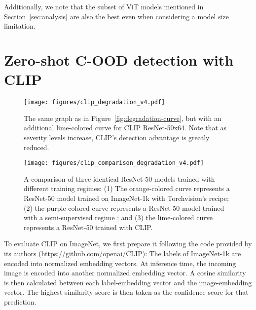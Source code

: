 \documentclass[table]{article} \usepackage{PRIMEarxiv}
\begin{document}
Additionally, we note that the subset of ViT models mentioned in Section~\ref{sec:analysis} are also the best even when considering a model size limitation.

\section{Zero-shot C-OOD detection with CLIP}
\label{sec:clip}
\begin{figure*}[h]
    \centering
    \texttt{[image: figures/clip\_degradation\_v4.pdf]}
    \caption{The same graph as in Figure~\ref{fig:degradation-curve}, but with an additional lime-colored curve for CLIP ResNet-50x64. Note that as severity levels increase, CLIP's detection advantage is greatly reduced.}
    \label{fig:clip_degradation}
\end{figure*}
\begin{figure*}[h]
    \centering
    \texttt{[image: figures/clip\_comparison\_degradation\_v4.pdf]}
    \caption{A comparison of three identical ResNet-50 models trained with different training regimes: (1) The orange-colored curve represents a ResNet-50 model trained on ImageNet-1k with Torchvision's recipe; (2) the purple-colored curve represents a ResNet-50 model trained with a semi-supervised regime \citep{DBLP:journals/corr/abs-1905-00546}; and (3) the lime-colored curve represents a ResNet-50 trained with CLIP.}
    \label{fig:clip_resnet_degradation}
\end{figure*}
To evaluate CLIP on ImageNet, we first prepare it following the code provided by its authors (https://github.com/openai/CLIP):
The labels of ImageNet-1k are encoded into normalized embedding vectors. At inference time, the incoming image is encoded into another normalized embedding vector. A cosine similarity is then calculated between each label-embedding vector and the image-embedding vector. The highest similarity score is then taken as the confidence score for that prediction.
\end{document}

